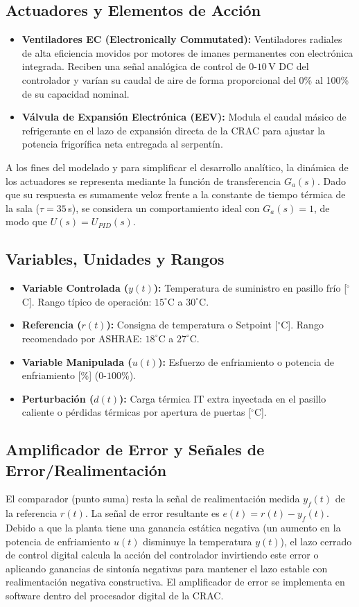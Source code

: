 \documentclass[journal,twocolumn]{IEEEtran}
\begin{document}
\subsection{Actuadores y Elementos de Acción}
\begin{itemize}
    \item \textbf{Ventiladores EC (Electronically Commutated):} Ventiladores radiales de alta eficiencia movidos por motores de imanes permanentes con electrónica integrada. Reciben una señal analógica de control de $0$-$10$\,V DC del controlador y varían su caudal de aire de forma proporcional del 0\% al 100\% de su capacidad nominal.
    \item \textbf{Válvula de Expansión Electrónica (EEV):} Modula el caudal másico de refrigerante en el lazo de expansión directa de la CRAC para ajustar la potencia frigorífica neta entregada al serpentín.
\end{itemize}

A los fines del modelado y para simplificar el desarrollo analítico, la dinámica de los actuadores se representa mediante la función de transferencia $G_a(s)$. Dado que su respuesta es sumamente veloz frente a la constante de tiempo térmica de la sala ($\tau = 35$\,s), se considera un comportamiento ideal con $G_a(s) = 1$, de modo que $U(s) = U_{PID}(s)$.

\subsection{Variables, Unidades y Rangos}
\begin{itemize}
    \item \textbf{Variable Controlada ($y(t)$):} Temperatura de suministro en pasillo frío [$^\circ$C]. Rango típico de operación: $15^\circ$C a $30^\circ$C.
    \item \textbf{Referencia ($r(t)$):} Consigna de temperatura o Setpoint [$^\circ$C]. Rango recomendado por ASHRAE: $18^\circ$C a $27^\circ$C.
    \item \textbf{Variable Manipulada ($u(t)$):} Esfuerzo de enfriamiento o potencia de enfriamiento [\%] ($0$-$100$\%).
    \item \textbf{Perturbación ($d(t)$):} Carga térmica IT extra inyectada en el pasillo caliente o pérdidas térmicas por apertura de puertas [$^\circ$C].
\end{itemize}

\subsection{Amplificador de Error y Señales de Error/Realimentación}
El comparador (punto suma) resta la señal de realimentación medida $y_f(t)$ de la referencia $r(t)$. La señal de error resultante es $e(t) = r(t) - y_f(t)$. Debido a que la planta tiene una ganancia estática negativa (un aumento en la potencia de enfriamiento $u(t)$ disminuye la temperatura $y(t)$), el lazo cerrado de control digital calcula la acción del controlador invirtiendo este error o aplicando ganancias de sintonía negativas para mantener el lazo estable con realimentación negativa constructiva. El amplificador de error se implementa en software dentro del procesador digital de la CRAC.
\end{document}
